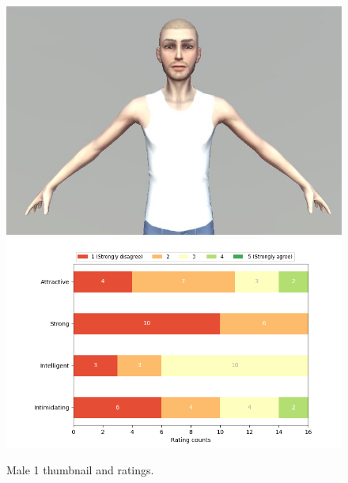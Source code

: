 \begin{figure}[H]
  \includegraphics[width=\linewidth]{Images/Males/1.JPG}
\endminipage\hfill
{}
  \includegraphics[width=\linewidth]{Survey/MRatings/avatar_m1.png}
\endminipage\hfill
\caption{Male 1 thumbnail and ratings.}
\end{figure}

